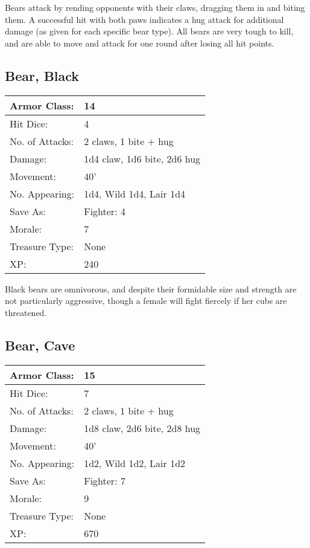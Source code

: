 \documentclass[a4paper,twoside,openany,10pt]{book}
\begin{document}
\begin{multicols}{2}
Bears attack by rending opponents with their claws, dragging them in and biting them. A successful hit with both paws indicates a hug attack for additional damage (as given for each specific bear type). All bears are very tough to kill, and are able to move and attack for one round after losing all hit points.


\subsection*{Bear, Black}\label{bear-black}

\begin{tabularx}{0.48\textwidth}{@{}lX@{}}
Armor Class: & 14 \\\hline
Hit Dice: & 4 \\\hline
No. of Attacks: & 2 claws, 1 bite + hug \\\hline
Damage: & 1d4 claw, 1d6 bite, 2d6 hug \\\hline
Movement: & 40' \\\hline
No. Appearing: & 1d4, Wild 1d4, Lair 1d4 \\\hline
Save As: & Fighter: 4 \\\hline
Morale: & 7 \\\hline
Treasure Type: & None \\\hline
XP: & 240 \\\hline
\end{tabularx}\medskip

Black bears are omnivorous, and despite their formidable size and strength are not particularly aggressive, though a female will fight fiercely if her cubs are threatened.

\subsection*{Bear, Cave}\label{bear-cave}

\begin{tabularx}{0.48\textwidth}{@{}lX@{}}
Armor Class: & 15 \\\hline
Hit Dice: & 7 \\\hline
No. of Attacks: & 2 claws, 1 bite + hug \\\hline
Damage: & 1d8 claw, 2d6 bite, 2d8 hug \\\hline
Movement: & 40' \\\hline
No. Appearing: & 1d2, Wild 1d2, Lair 1d2 \\\hline
Save As: & Fighter: 7 \\\hline
Morale: & 9 \\\hline
Treasure Type: & None \\\hline
XP: & 670 \\\hline
\end{tabularx}


\end{multicols}
\end{document}
